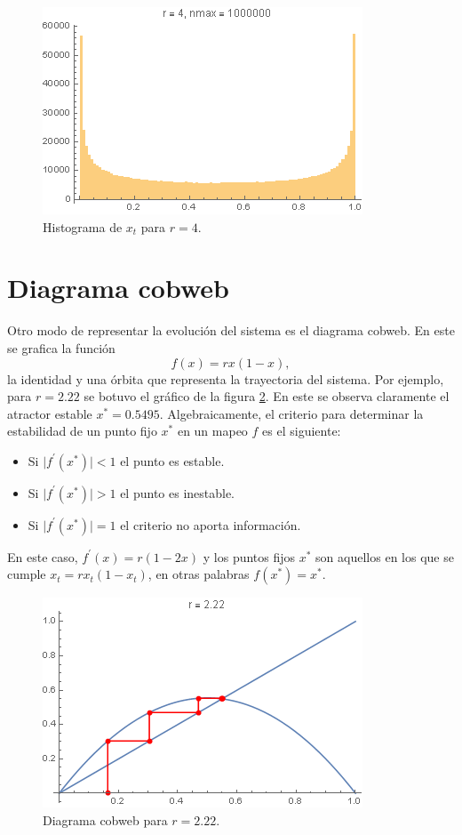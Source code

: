 \documentclass[aps,prb,twocolumn,superscriptaddress,floatfix,longbibliography]{revtex4-2}
\newcounter{para}
\begin{document}
\begin{figure}[htp]
    \includegraphics[clip=true,width=0.7\columnwidth]{a.histograma_4.png}
    \caption{Histograma de $x_t$ para $r = 4$.}
     \label{fig:a.histograma_4}
\end{figure}


\section{\label{sec:b}Diagrama cobweb}

Otro modo de representar la evolución del sistema es el diagrama cobweb. En este se grafica la función
\[f(x) = r x (1-x),\]
la identidad y una órbita que representa la trayectoria del sistema. Por ejemplo,  para $r = 2.22$ se botuvo el gráfico de la figura \ref{fig:b.cobweb.r_2.22}. En este se observa claramente el atractor estable $x^* = 0.5495$. Algebraicamente, el criterio para determinar la estabilidad de un punto fijo $x^*$ en un mapeo $f$ es el siguiente:
\begin{itemize}
    \item Si $\mid f^{\prime} (x^{*})\mid < 1$ el punto es estable.
    \item Si $\mid f^\prime(x^*)\mid > 1 $ el punto es inestable.
    \item Si  $\mid f^\prime(x^*)\mid = 1 $ el criterio no aporta información.
\end{itemize}
En este caso, $f^\prime(x) = r(1 - 2x)$ y los puntos fijos $x^*$ son aquellos en los que se cumple $x_t = r x_t (1-x_t)$, en otras palabras $f(x^*) = x^*$.

\begin{figure}[htp]
    \includegraphics[clip=true,width=0.7\columnwidth]{b.cobweb.r_2.22.png}
    \caption{Diagrama cobweb para $r = 2.22$.}
     \label{fig:b.cobweb.r_2.22}
\end{figure}
\end{document}
